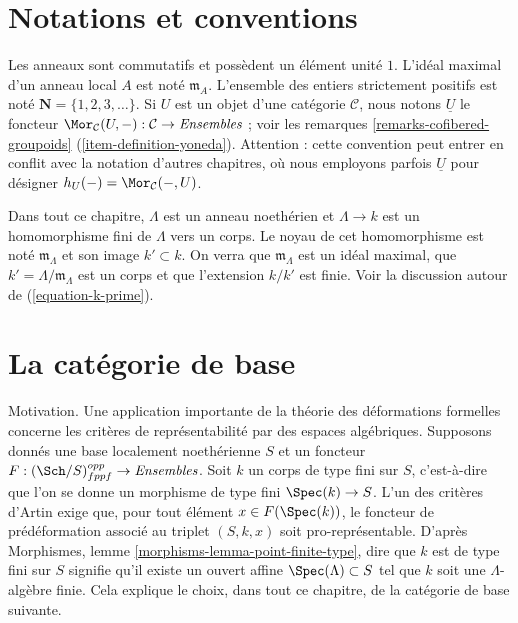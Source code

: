 \section{Notations et conventions}
\label{section-notations-conventions}

\noindent
Les anneaux sont commutatifs et possèdent un élément unité $1$. L'idéal maximal d'un anneau local
$A$ est noté $\mathfrak{m}_A$. L'ensemble des entiers strictement positifs est
noté $\mathbf{N} = \{1, 2, 3, \ldots\}$. Si $U$ est un objet d'une catégorie
$\mathcal{C}$, nous notons $\underline{U}$ le foncteur
$\Mor_\mathcal{C}(U, -): \mathcal{C} \to \textit{Ensembles}$ ; voir les remarques
\ref{remarks-cofibered-groupoids} (\ref{item-definition-yoneda}). Attention :
cette convention peut entrer en conflit avec la notation d'autres chapitres,
où nous employons parfois $\underline{U}$ pour désigner
$h_U(-) = \Mor_\mathcal{C}(-, U)$.

\medskip\noindent
Dans tout ce chapitre, $\Lambda$ est un anneau noethérien et
$\Lambda \to k$ est un homomorphisme fini de $\Lambda$ vers un corps.
Le noyau de cet homomorphisme est noté $\mathfrak m_\Lambda$ et son image
$k' \subset k$. On verra que $\mathfrak m_\Lambda$ est un idéal maximal,
que $k' = \Lambda/\mathfrak m_\Lambda$ est un corps et que l'extension
$k/k'$ est finie. Voir la discussion autour de
(\ref{equation-k-prime}).


\section{La catégorie de base}
\label{section-CLambda}

\noindent
Motivation. Une application importante de la théorie des déformations formelles
concerne les critères de représentabilité par des espaces algébriques.
Supposons donnés une base localement noethérienne $S$ et un foncteur
$F : (\Sch/S)_{fppf}^{opp} \to \textit{Ensembles}$.
Soit $k$ un corps de type fini sur $S$, c'est-à-dire que l'on se donne un
morphisme de type fini $\Spec(k) \to S$.
L'un des critères d'Artin exige que, pour tout élément
$x \in F(\Spec(k))$, le foncteur de prédéformation associé au triplet
$(S, k, x)$ soit pro-représentable. D'après Morphismes, lemme
\ref{morphisms-lemma-point-finite-type}, dire que $k$ est de type fini sur
$S$ signifie qu'il existe un ouvert affine $\Spec(\Lambda) \subset S$ tel que
$k$ soit une $\Lambda$-algèbre finie. Cela explique le choix, dans tout ce
chapitre, de la catégorie de base suivante.

